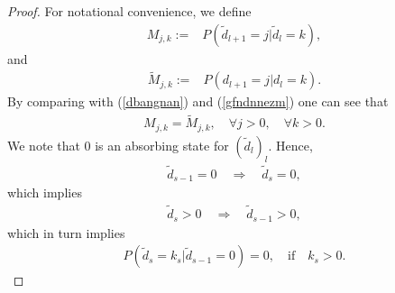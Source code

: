 \documentclass[a4paper,aps,floatfix]{revtex4}
\begin{document}
\begin{proof}

For notational convenience, we define
\begin{equation}
\label{netntmeh}
\begin{split}
M_{j,k} := &  P(\tilde{d}_{l+1} = j|\tilde{d}_{l} = k),
\end{split}
\end{equation}
and
\begin{equation}
\label{sfgsfgnsfgnswnr}
\begin{split}
\tilde{M}_{j,k} := & P(d_{l+1} = j|d_{l} = k).
\end{split}
\end{equation}
By comparing with (\ref{dbangnan}) and (\ref{gfndnnezm}) one can see that
\begin{equation}
\label{adfbsfgnf}
\begin{split}
M_{j,k} = \tilde{M}_{j,k},\quad \forall j>0,\quad \forall k>0.
\end{split}
\end{equation}
We note that $0$ is an absorbing state for $(\tilde{d}_l)_l$. Hence, 
\begin{equation}
\begin{split}
 \tilde{d}_{s-1} = 0\quad\Rightarrow\quad \tilde{d}_{s} = 0,
\end{split}
\end{equation}
which implies
\begin{equation}
\begin{split}
\tilde{d}_s>0 \quad \Rightarrow\quad \tilde{d}_{s-1}>0,
\end{split}
\end{equation}
which in turn implies
\begin{equation}
\label{sbadngnngr}
\begin{split}
 P(\tilde{d}_s= k_s|\tilde{d}_{s-1}=0) = 0,\quad\textrm{if}\quad k_s >0.
\end{split}
\end{equation}


\end{proof}
\end{document}
